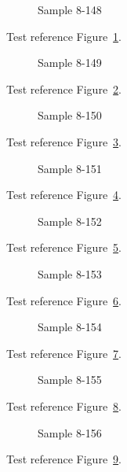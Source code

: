\begin{figure}[tbhp]
\caption{Sample 8-148}
\label{fig:sample-8-148}
\end{figure}

Test reference Figure~\ref{fig:sample-8-148}.

\begin{figure}[tbhp]
\caption{Sample 8-149}
\label{fig:sample-8-149}
\end{figure}

Test reference Figure~\ref{fig:sample-8-149}.

\begin{figure}[tbhp]
\caption{Sample 8-150}
\label{fig:sample-8-150}
\end{figure}

Test reference Figure~\ref{fig:sample-8-150}.

\begin{figure}[tbhp]
\caption{Sample 8-151}
\label{fig:sample-8-151}
\end{figure}

Test reference Figure~\ref{fig:sample-8-151}.

\begin{figure}[tbhp]
\caption{Sample 8-152}
\label{fig:sample-8-152}
\end{figure}

Test reference Figure~\ref{fig:sample-8-152}.

\begin{figure}[tbhp]
\caption{Sample 8-153}
\label{fig:sample-8-153}
\end{figure}

Test reference Figure~\ref{fig:sample-8-153}.

\begin{figure}[tbhp]
\caption{Sample 8-154}
\label{fig:sample-8-154}
\end{figure}

Test reference Figure~\ref{fig:sample-8-154}.

\begin{figure}[tbhp]
\caption{Sample 8-155}
\label{fig:sample-8-155}
\end{figure}

Test reference Figure~\ref{fig:sample-8-155}.

\begin{figure}[tbhp]
\caption{Sample 8-156}
\label{fig:sample-8-156}
\end{figure}

Test reference Figure~\ref{fig:sample-8-156}.

